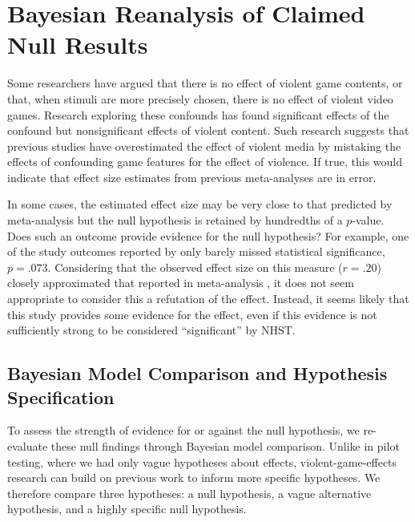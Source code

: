\documentclass[man]{apa6}
\begin{document}
\section{Bayesian Reanalysis of Claimed Null Results}
Some researchers have argued that there is no effect of violent game contents, or that, when stimuli are more precisely chosen, there is no effect of violent video games. Research exploring these confounds has found significant effects of the confound but nonsignificant effects of violent content. Such research suggests that previous studies have overestimated the effect of violent media by mistaking the effects of confounding game features for the effect of violence. If true, this would indicate that effect size estimates from previous meta-analyses \citep[e.g., $r = .21$,][]{Anderson:etal:2010} are in error.  

In some cases, the estimated effect size may be very close to that predicted by meta-analysis but the null hypothesis is retained by hundredths of a $p$-value. Does such an outcome provide evidence for the null hypothesis? For example, one of the study outcomes reported by \citet{Elson:etal:2013} only barely missed statistical significance, $p = .073$. Considering that the observed effect size on this measure ($r = .20$) closely approximated that reported in meta-analysis \citep[$r = .21$,][]{Anderson:etal:2010}, it does not seem appropriate to consider this a refutation of the effect. %
Instead, it seems likely that this study provides some evidence for the effect, even if this evidence is not sufficiently strong to be considered ``significant'' by NHST. 

\subsection{Bayesian Model Comparison and Hypothesis Specification}
To assess the strength of evidence for or against the null hypothesis, we re-evaluate these null findings through Bayesian model comparison. Unlike in pilot testing, where we had only vague hypotheses about effects, violent-game-effects research can build on previous work to inform more specific hypotheses. We therefore compare three hypotheses: a null hypothesis, a vague alternative hypothesis, and a highly specific null hypothesis. 
\end{document}
